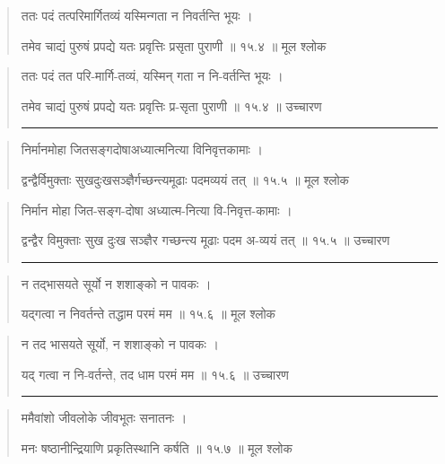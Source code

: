 \begin{quotation}

ततः पदं तत्परिमार्गितव्यं यस्मिन्गता न निवर्तन्ति भूयः  ।  

तमेव चाद्यं पुरुषं प्रपद्ये यतः प्रवृत्तिः प्रसृता पुराणी  ॥ १५.४ ॥  मूल श्लोक
\end{quotation}

\begin{quotation}

ततः पदं तत परि-मार्गि-तव्यं,
यस्मिन् गता न नि-वर्तन्ति भूयः  ।  

तमेव चाद्यं पुरुषं प्रपद्ये यतः 
प्रवृत्तिः प्र-सृता पुराणी  ॥ १५.४ ॥  उच्चारण

\noindent\rule{16cm}{0.4pt} 
\end{quotation}


\begin{quotation}
निर्मानमोहा जितसङ्गदोषाअध्यात्मनित्या विनिवृत्तकामाः  ।  

द्वन्द्वैर्विमुक्ताः सुखदुःखसञ्ज्ञैर्गच्छन्त्यमूढाः पदमव्ययं तत्‌  ॥ १५.५ ॥  मूल श्लोक
\end{quotation}

\begin{quotation}

निर्मान मोहा जित-सङ्ग-दोषा
अध्यात्म-नित्या वि-निवृत्त-कामाः  ।  

द्वन्द्वैर विमुक्ताः सुख दुःख सञ्ज्ञैर 
गच्छन्त्य मूढाः पदम अ-व्ययं तत्‌  ॥ १५.५ ॥  उच्चारण

\noindent\rule{16cm}{0.4pt} 
\end{quotation}


\begin{quotation}

न तद्भासयते सूर्यो न शशाङ्को न पावकः  ।  

यद्गत्वा न निवर्तन्ते तद्धाम परमं मम  ॥ १५.६ ॥  मूल श्लोक
\end{quotation}

\begin{quotation}

न तद भासयते सूर्यो, न शशाङ्को न पावकः  ।  

यद् गत्वा न नि-वर्तन्ते, तद धाम परमं मम  ॥ १५.६ ॥  उच्चारण

\noindent\rule{16cm}{0.4pt} 
\end{quotation}


\begin{quotation}

ममैवांशो जीवलोके जीवभूतः सनातनः  ।  

मनः षष्ठानीन्द्रियाणि प्रकृतिस्थानि कर्षति  ॥ १५.७ ॥  मूल श्लोक
\end{quotation}

